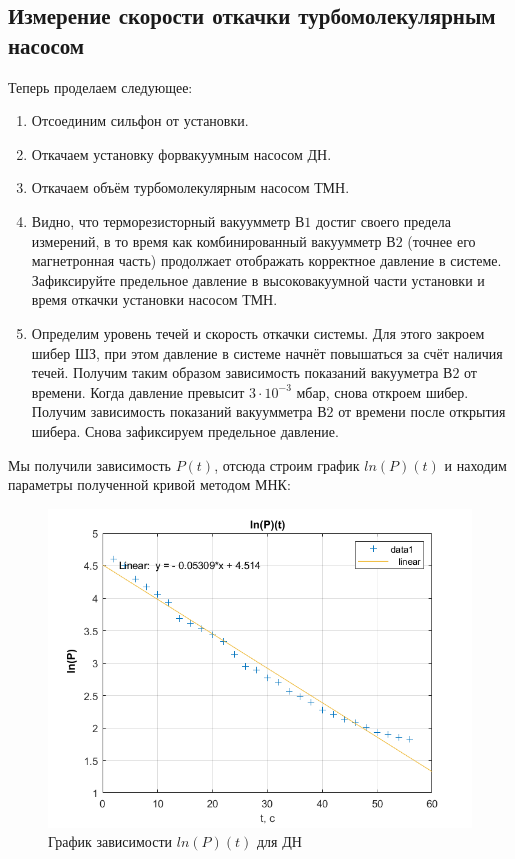 \documentclass[a4paper, 12pt]{article} %
\begin{document}
\subsection{Измерение скорости откачки турбомолекулярным насосом}

Теперь проделаем следующее:

\begin{enumerate}
    \item Отсоединим сильфон от установки.
    \item Откачаем установку форвакуумным насосом ДН.
    \item Откачаем объём турбомолекулярным насосом ТМН.
    \item Видно, что терморезисторный вакуумметр $В1$ достиг своего предела измерений, в то время как комбинированный вакуумметр $В2$ (точнее его магнетронная часть) продолжает отображать корректное давление в системе. Зафиксируйте предельное давление в высоковакуумной части установки и время откачки установки насосом ТМН.
    \item Определим уровень течей и скорость откачки системы. Для этого закроем шибер ШЗ, при этом давление в системе начнёт повышаться за счёт наличия течей. Получим таким образом зависимость показаний вакууметра $В2$ от времени. Когда давление превысит $3 \cdot 10^{-3}$ мбар,
снова откроем шибер. Получим зависимость показаний вакуумметра $В2$ от времени после открытия шибера. Снова зафиксируем предельное давление.
\end{enumerate}

Мы получили зависимость $P(t)$, отсюда строим график $ln(P)(t)$ и находим параметры полученной кривой методом МНК:

\begin{figure}[h]
    \centering
    \includegraphics[width = 11 cm]{fig1}
    \caption{График зависимости $ln(P)(t)$ для ДН}
    \label{fig:vac}
\end{figure}
\end{document}
